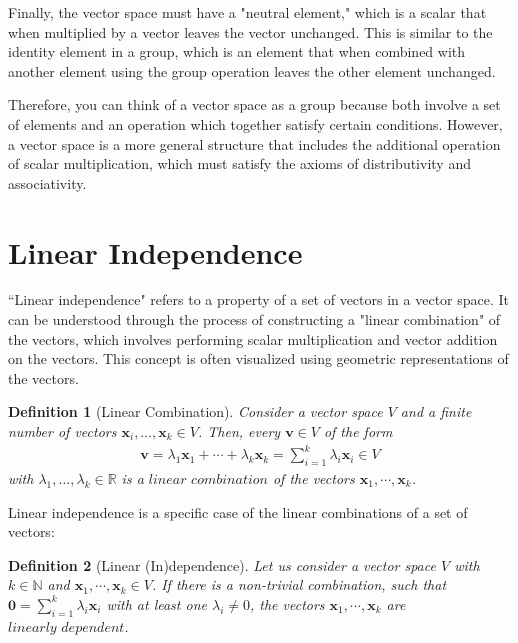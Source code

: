 \documentclass[12pt]{book}
\newtheorem{definition}{Definition}[section]
\begin{document}
	Finally, the vector space must have a "neutral element," which is a scalar that when multiplied by a vector leaves the vector unchanged. This is similar to the identity element in a group, which is an element that when combined with another element using the group operation leaves the other element unchanged.
	
	Therefore, you can think of a vector space as a group because both involve a set of elements and an operation which together satisfy certain conditions. However, a vector space is a more general structure that includes the additional operation of scalar multiplication, which must satisfy the axioms of distributivity and associativity.
	
	\section{Linear Independence}
	``Linear independence" refers to a property of a set of vectors in a vector space. It can be understood through the process of constructing a "linear combination" of the vectors, which involves performing scalar multiplication and vector addition on the vectors. This concept is often visualized using geometric representations of the vectors.
	
	\begin{definition}[Linear Combination]
		\normalfont	Consider a vector space $\textit{V}$ and a finite number of vectors $\boldsymbol{x}_i,\ldots,\boldsymbol{x}_k \in \textit{V}$. Then, every $\boldsymbol{v} \in \textit{V}$ of the form
		\begin{align}
			\boldsymbol{v} = \lambda_1\boldsymbol{x}_1 + \cdots + \lambda_k\boldsymbol{x}_k =  \sum_{i=1}^{k} \lambda_i\boldsymbol{x}_i \in \textit{V}
		\end{align}
		with $\lambda_1,\ldots,\lambda_k \in \mathbb{R}$ is a $\textit{linear combination}$ of the vectors $\boldsymbol{x}_1,\cdots,\boldsymbol{x}_k$.
	\end{definition}
	
	Linear independence is a specific case of the linear combinations of a set of vectors:
	
	\begin{definition}[Linear (In)dependence]
		\normalfont Let us consider a vector space $\textit{V}$ with $k \in \mathbb{N}$ and  $\boldsymbol{x}_1,\cdots,\boldsymbol{x}_k \in \mathit{V}$. If there is a non-trivial combination, such that $\textbf{0} = \sum_{i=1}^{k} \lambda_i\boldsymbol{x}_i$ with at least one $\lambda_i \ne 0$, the vectors  $\boldsymbol{x}_1,\cdots,\boldsymbol{x}_k$ are $\textit{linearly dependent}$. 
	\end{definition}
	
\end{document}
